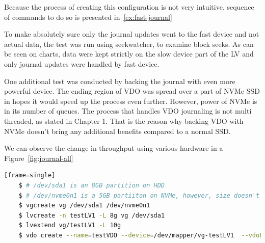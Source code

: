 \documentclass[
  color, %
  table, %
  lof,   %
  lot,   %
]{fithesis3}
\begin{document}
Because the process of creating this configuration is not very intuitive, sequence of commands to do so is presented in~\ref{ex:fast-journal}

To make absolutely sure only the journal updates went to the fast device and not actual data, the test was run using seekwatcher, to examine block seeks. As can be seen on charts, data were kept strictly on the slow device part of the LV and only journal updates were handled by fast device.

One additional test was conducted by backing the journal with even more powerful device. The ending region of VDO was spread over a part of NVMe SSD in hopes it would speed up the process even further. However, power of NVMe is in its number of queues. The process that handles VDO journaling is not multi threaded, as stated in Chapter 1. That is the reason why backing VDO with NVMe doesn't bring any additional benefits compared to a normal SSD.

We can observe the change in throughput using various hardware in a Figure~\ref{fig:journal-all}



\begin{lstlisting}[language=bash, label={ex:fast-journal}, caption={Creating a volume with last reagion on NVMe device}][frame=single]
    $ # /dev/sda1 is an 8GB partition on HDD
    $ # /dev/nvme0n1 is a 5GB partiiton on NVMe, however, size doesn't matter since we're only using first 2GB
    $ vgcreate vg /dev/sda1 /dev/nvme0n1
    $ lvcreate -n testLV1 -L 8g vg /dev/sda1
    $ lvextend vg/testLV1 -L 10g
    $ vdo create --name=testVDO --device=/dev/mapper/vg-testLV1  --vdoLogicalSize=80g
\end{lstlisting}
\end{document}
